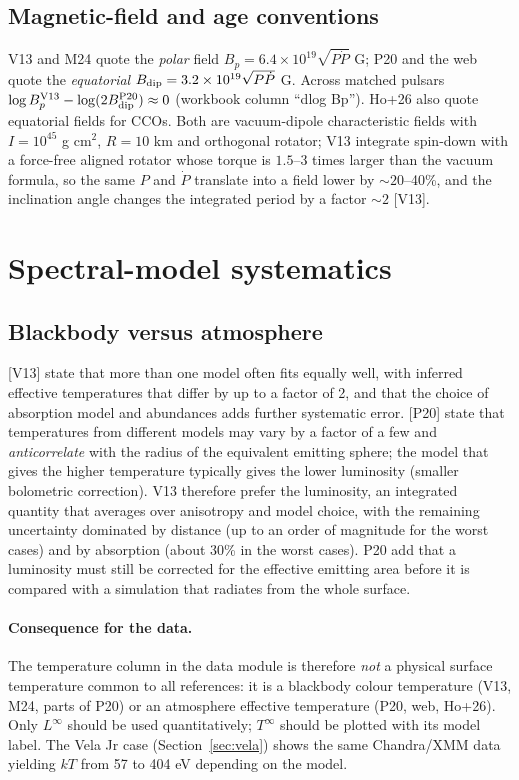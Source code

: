 \documentclass[11pt,a4paper]{article}
\newcommand{\src}[1]{\textsf{[#1]}}
\begin{document}
\subsection{Magnetic-field and age conventions}
V13 and M24 quote the \emph{polar} field $B_p=6.4\times10^{19}\sqrt{P\dot P}$ G; P20 and the web quote the \emph{equatorial} $B_{\rm dip}=3.2\times10^{19}\sqrt{P\dot P}$ G. Across matched pulsars $\log B_p^{\rm V13}-\log(2B_{\rm dip}^{\rm P20})\approx0$ (workbook column ``dlog Bp''). Ho+26 also quote equatorial fields for CCOs. Both are vacuum-dipole characteristic fields with $I=10^{45}$ g cm$^2$, $R=10$ km and orthogonal rotator; V13 integrate spin-down with a force-free aligned rotator whose torque is $1.5$--$3$ times larger than the vacuum formula, so the same $P$ and $\dot P$ translate into a field lower by $\sim20$--40\%, and the inclination angle changes the integrated period by a factor $\sim2$ \src{V13}.

\section{Spectral-model systematics}\label{sec:spectral}
\subsection{Blackbody versus atmosphere}
\src{V13} state that more than one model often fits equally well, with inferred effective temperatures that differ by up to a factor of 2, and that the choice of absorption model and abundances adds further systematic error. \src{P20} state that temperatures from different models may vary by a factor of a few and \emph{anticorrelate} with the radius of the equivalent emitting sphere; the model that gives the higher temperature typically gives the lower luminosity (smaller bolometric correction). V13 therefore prefer the luminosity, an integrated quantity that averages over anisotropy and model choice, with the remaining uncertainty dominated by distance (up to an order of magnitude for the worst cases) and by absorption (about 30\% in the worst cases). P20 add that a luminosity must still be corrected for the effective emitting area before it is compared with a simulation that radiates from the whole surface.

\paragraph{Consequence for the data.} The temperature column in the data module is therefore \emph{not} a physical surface temperature common to all references: it is a blackbody colour temperature (V13, M24, parts of P20) or an atmosphere effective temperature (P20, web, Ho+26). Only $L^\infty$ should be used quantitatively; $T^\infty$ should be plotted with its model label. The Vela Jr case (Section~\ref{sec:vela}) shows the same Chandra/XMM data yielding $kT$ from 57 to 404 eV depending on the model.
\end{document}
